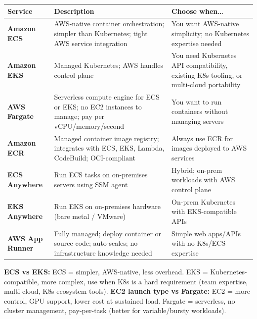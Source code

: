 \begin{comparebox}[title={Container service comparison}]
\begin{tabular}{@{}p{3.2cm}p{5cm}p{3.8cm}@{}}
\toprule
\textbf{Service} & \textbf{Description} & \textbf{Choose when\ldots} \\
\midrule
\textbf{Amazon ECS}          & AWS-native container orchestration; simpler than Kubernetes;
                               tight AWS service integration &
  You want AWS-native simplicity; no Kubernetes expertise needed \\[4pt]
\textbf{Amazon EKS}          & Managed Kubernetes; AWS handles control plane &
  You need Kubernetes API compatibility, existing K8s tooling, or multi-cloud portability \\[4pt]
\textbf{AWS Fargate}         & Serverless compute engine for ECS or EKS; no EC2 instances to manage;
                               pay per vCPU/memory/second &
  You want to run containers without managing servers \\[4pt]
\textbf{Amazon ECR}          & Managed container image registry; integrates with ECS, EKS, Lambda,
                               CodeBuild; OCI-compliant &
  Always use ECR for images deployed to AWS services \\[4pt]
\textbf{ECS Anywhere}        & Run ECS tasks on on-premises servers using SSM agent &
  Hybrid; on-prem workloads with AWS control plane \\[4pt]
\textbf{EKS Anywhere}        & Run EKS on on-premises hardware (bare metal / VMware) &
  On-prem Kubernetes with EKS-compatible APIs \\[4pt]
\textbf{AWS App Runner}      & Fully managed; deploy container or source code; auto-scales;
                               no infrastructure knowledge needed &
  Simple web apps/APIs with no K8s/ECS expertise \\
\bottomrule
\end{tabular}
\end{comparebox}

\begin{examtip}
\textbf{ECS vs EKS:} ECS = simpler, AWS-native, less overhead. EKS = Kubernetes-compatible,
more complex, use when K8s is a hard requirement (team expertise, multi-cloud, K8s ecosystem tools).
\textbf{EC2 launch type vs Fargate:} EC2 = more control, GPU support, lower cost at sustained load.
Fargate = serverless, no cluster management, pay-per-task (better for variable/bursty workloads).
\end{examtip}

